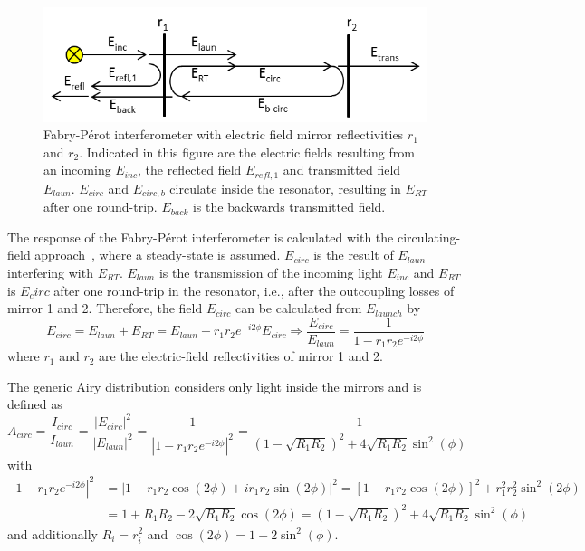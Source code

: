\begin{figure}[H]
	\centering
	\includegraphics[width=0.7\linewidth]{figures/fabry-perot/Schematic_of_the_Fabry-Perot_interferometer}
	\caption[Fabry-Pérot interferometer with electric field mirror reflectivities $r_1$ and $r_2$]{Fabry-Pérot interferometer with electric field mirror reflectivities $r_1$ and $r_2$. Indicated in this figure are the electric fields resulting from an incoming $E_{inc}$, the reflected field $E_{refl,1}$ and transmitted field $E_{laun}$. $E_{circ}$ and $E_{circ,b}$ circulate inside the resonator, resulting in $E_{RT}$ after one round-trip. $E_{back}$ is the backwards transmitted field.\cite{noauthor_fabryperot_nodate}}
	\label{fig:schematicofthefabry-perotinterferometer}
\end{figure}
The response of the Fabry-Pérot interferometer is calculated with the circulating-field approach~\cite{ismail_fabry-perot_2016}, where a steady-state is assumed.
$E_{circ}$ is the result of $E_{laun}$ interfering with $E_{RT}$.
$E_{laun}$ is the transmission of the incoming light $E_{inc}$ and $E_{RT}$ is $E_circ$ after one round-trip in the resonator, i.e., after the outcoupling losses of mirror 1 and 2.
Therefore, the field $E_{circ}$ can be calculated from $E_{launch}$ by
\begin{equation}
E_{circ} = E_{laun} + E_{RT} = E_{laun} + r_1 r_2 e^{-i 2 \phi} E_{circ} \Rightarrow \frac{E_{circ}}{E_{laun}} = \frac{1}{1 - r_1 r_2 e^{-i 2 \phi}}
\end{equation}
where $r_1$ and $r_2$ are the electric-field reflectivities of mirror 1 and 2.

The generic Airy distribution considers only light inside the mirrors and is defined as
\begin{equation}
A_{circ} = \frac{I_{circ}}{I_{laun}} = \frac{|E_{circ}|^2}{|E_{laun}|^2} = \frac{1}{\left|1 - r_1 r_2 e^{-i2\phi}\right|^2} = \frac{1}{\left(1-\sqrt{R_1 R_2}\right)^2 + 4\sqrt{R_1 R_2} \sin^2(\phi)}
\end{equation}
with
\begin{align*}
\left|1-r_1 r_2 e^{-i2\phi}\right|^2 &= \left|1- r_1 r_2 \cos(2\phi) + i r_1 r_2 \sin(2\phi)\right|^2 = \left[1-r_1 r_2 \cos(2\phi)\right]^2 + r_1^2 r_2^2 \sin^2(2\phi) \\
 &=1+R_1 R_2 - 2\sqrt{R_1 R_2} \cos(2\phi) = \left(1-\sqrt{R_1 R_2}\right)^2 + 4 \sqrt{R_1 R_2} \sin^2(\phi)
\end{align*}
and additionally $R_i = r_i^2$ and $\cos(2\phi) = 1 -2\sin^2(\phi)$.

